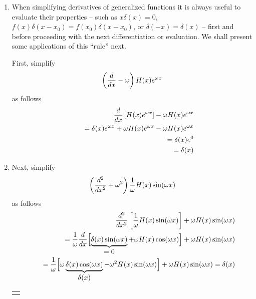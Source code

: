 {\begin{enumerate}
\item
When simplifying derivatives of generalized functions it is always useful to evaluate their properties
--
such as $x\delta(x)=0$, $f(x)\delta(x-x_0)=f(x_0)\delta(x-x_0)$, or $\delta (-x)=\delta (x)$
--
first and  before proceeding with the next differentiation or evaluation.
We shall present some applications of this ``rule'' next.

First, simplify
\begin{equation}
\left({d\over dx}-\omega \right)H (x)e^{\omega x}
\end{equation}
as follows
\begin{equation}
\begin{split}
 {d\over dx}\left[H(x)e^{\omega
x}\right]-\omega H(x)e^{\omega x}\\
\qquad =
   \delta(x)e^{\omega x}+\omega H(x)e^{\omega x}-\omega H(x)
   e^{\omega x}\\
\qquad =
   \delta(x)e^{0}
   \\
\qquad =  \delta(x)
\end{split}
\end{equation}


\item
Next, simplify
\begin{equation}
\left({d^2\over dx^2}+\omega^2 \right){1\over \omega }H
 (x)\sin (\omega x)
\end{equation}
as follows
\begin{equation}
\begin{split}
{d^2\over dx^2}\left[{1\over\omega}H(x)\sin(\omega
x)\right]+\omega H(x)
      \sin(\omega x)\\
   \qquad =   {1\over\omega}{d\over dx}\Bigl[\underbrace{\delta(x)\sin(\omega x)}_
      {\mbox{$=0$}}+\omega H(x)\cos(\omega x)\Bigr]+\omega H(x)
      \sin(\omega x)\\
  \qquad =   {1\over\omega}\Bigl[\omega\underbrace{\delta(x)\cos(\omega x)}_
      {\mbox{$\delta(x)$}}-\omega^2H(x)\sin(\omega x)\Bigr]+
      \omega H(x)\sin(\omega x)=\delta(x)
\end{split}
\end{equation}

\begin{marginfigure}
{\color{black}
\begin{center}
\begin{tabular}{c}

\begin{tikzpicture}[ scale=0.4,
 declare function={
    func(\x)= (\x )
   ;
                  } ]


\end{tikzpicture}
\end{tabular}
\end{center}}
\end{marginfigure}
\end{enumerate}}
